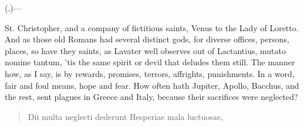 {(.)---

St. Christopher, and a company of fictitious saints, Venus to the Lady
of Loretto. And as those old Romans had several distinct gods, for
diverse offices, persons, places, so have they saints, as Lavater
well observes out of Lactantius, mutato nomine tantum, 'tis the same
spirit or devil that deludes them still. The manner how, as I say, is
by rewards, promises, terrors, affrights, punishments. In a word, fair
and foul means, hope and fear. How often hath Jupiter, Apollo, Bacchus,
and the rest, sent plagues in Greece and Italy, because their
sacrifices were neglected?

\begin{latin}
\begin{verse}%
Dii multa neglecti dederunt
Hesperiae mala luctuosae,
\end{verse}%
\end{latin}

}
